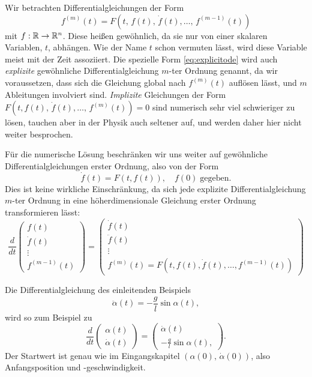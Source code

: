 Wir betrachten Differentialgleichungen der Form
\begin{equation}
  \label{eq:explicitode}
  f^{(m)}(t) = F(t,\, f(t),\, \dot f(t), \ldots,\, f^{(m-1)}(t))
\end{equation}
mit $f:\mathbb{R}\to\mathbb{R}^n$. Diese heißen gewöhnlich, da sie nur von einer
skalaren Variablen, $t$, abhängen. Wie der Name $t$ schon vermuten
lässt, wird diese Variable meist mit der Zeit assoziiert. Die spezielle
Form \eqref{eq:explicitode} wird auch \emph{explizite} gewöhnliche
Differentialgleichung $m$-ter Ordnung genannt, da wir voraussetzen,
dass sich die Gleichung global nach $f^{(m)}(t)$ auflösen lässt, und
$m$ Ableitungen involviert sind. \emph{Implizite} Gleichungen der Form
$F(t, f(t),\,\dot f(t), \ldots,\,f^{(m)}(t)) = 0$ sind
numerisch sehr viel schwieriger zu lösen, tauchen aber in der Physik
auch seltener auf, und werden daher hier nicht weiter besprochen.

Für die numerische Lösung beschränken wir uns weiter auf gewöhnliche
Differentialgleichungen erster Ordnung, also von der Form
\begin{equation}
  \label{eq:1storderode}
  \dot f(t) = F(t, f(t)),\quad f(0)\;\text{gegeben}.
\end{equation}
Dies ist keine wirkliche Einschränkung, da sich jede explizite
Differentialgleichung $m$-ter Ordnung in eine höherdimensionale
Gleichung erster Ordnung transformieren lässt:
\begin{equation}
  \frac{d}{dt}\begin{pmatrix}
    f(t)\\
    \dot f(t)\\
    \vdots\\
    f^{(m-1)}(t)
  \end{pmatrix}
  =
  \begin{pmatrix}
    \dot f(t)\\
    \ddot f(t)\\
    \vdots\\
    f^{(m)}(t) = F(t, f(t), \dot f(t), \ldots, f^{(m-1)}(t))
  \end{pmatrix}
\end{equation}

Die Differentialgleichung des einleitenden Beispiels
\begin{equation}
  \label{eq:fadenpendel2}
  \ddot \alpha(t) = -\frac{g}{l}\sin \alpha(t),
\end{equation}
wird so zum Beispiel zu
\begin{equation}
  \frac{d}{dt}\begin{pmatrix}
    \alpha(t)\\
    \dot \alpha(t)
  \end{pmatrix}
  =
  \begin{pmatrix}
    \dot \alpha(t)\\
    -\frac{g}{l}\sin \alpha(t),
  \end{pmatrix}.
\end{equation}  
Der Startwert ist genau wie im Eingangskapitel $(\alpha(0),\, \dot
\alpha(0))$, also Anfangsposition und -geschwindigkeit.

